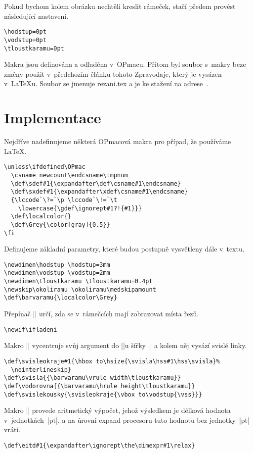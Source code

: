 \documentclass{csbulletin}
\def\p#1{\texttt{\char`\\#1}}
\def\soub#1{{\sf#1}}
\def\barvaramu{\color[cmyk]{0,0,0,0.4}}
\begin{document}
Pokud bychom kolem obrázku nechtěli kreslit rámeček, stačí předem provést následující nastavení.
\begin{Verbatim}[numbers=none]
\hodstup=0pt
\vodstup=0pt
\tloustkaramu=0pt
\end{Verbatim}

Makra jsou definována a odladěna v~OPmacu. Přitom byl soubor s~makry beze změny použit v~předchozím článku tohoto Zpravodaje, který je vysázen v~\LaTeX u. Soubor se jmenuje \soub{rezani.tex} a je ke stažení na adrese~\cite{rezaniweb}.


\section{Implementace}
\label{S81}

Nejdříve nadefinujeme některá OPmacová makra pro případ, že používáme \LaTeX.

\begin{Verbatim}[firstnumber=auto]
\unless\ifdefined\OPmac
  \csname newcount\endcsname\tmpnum
  \def\sdef#1{\expandafter\def\csname#1\endcsname}
  \def\sxdef#1{\expandafter\xdef\csname#1\endcsname}
  {\lccode`\?=`\p \lccode`\!=`\t
    \lowercase{\gdef\ignorept#1?!{#1}}}
  \def\localcolor{}
  \def\Grey{\color[gray]{0.5}}
\fi
\end{Verbatim}

Definujeme základní parametry, které budou postupně vysvětleny dále v~textu.
\begin{Verbatim}
\newdimen\hodstup \hodstup=3mm
\newdimen\vodstup \vodstup=2mm
\newdimen\tloustkaramu \tloustkaramu=0.4pt
\newskip\okoliramu \okoliramu\medskipamount
\def\barvaramu{\localcolor\Grey}
\end{Verbatim}

Přepínač |\ifladeni| určí, zda se v~rámečcích mají zobrazovat místa řezů.
\begin{Verbatim}
\newif\ifladeni
\end{Verbatim}

Makro |\svisleokraje| vycentruje svůj argument do |\hbox|u šířky |\hsize| a kolem něj vysází svislé linky.
\begin{Verbatim}
\def\svisleokraje#1{\hbox to\hsize{\svisla\hss#1\hss\svisla}%
  \nointerlineskip}
\def\svisla{{\barvaramu\vrule width\tloustkaramu}}
\def\vodorovna{{\barvaramu\hrule height\tloustkaramu}}
\def\svislekousky{\svisleokraje{\vbox to\vodstup{\vss}}}
\end{Verbatim}

Makro |\eitd| provede aritmetický výpočet, jehož výsledkem je délková hodnota v~jednotkách~|pt|, a na úrovni expand procesoru tuto hodnotu bez jednotky~|pt| vrátí.
\begin{Verbatim}
\def\eitd#1{\expandafter\ignorept\the\dimexpr#1\relax}
\end{Verbatim}
\end{document}
